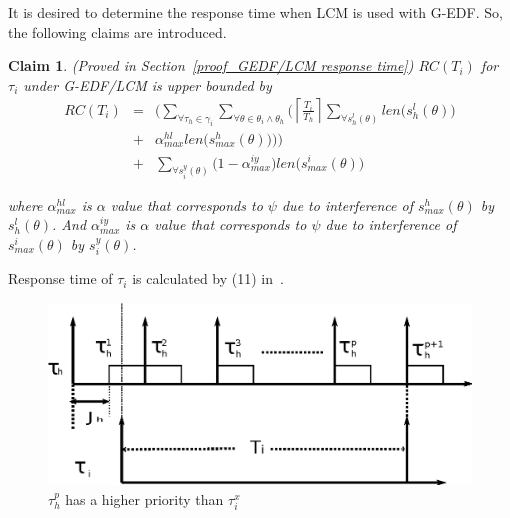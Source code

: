 \documentclass[conference]{sig-alternate}
\newtheorem{clm}{Claim}
\begin{document}
It is desired to determine the response time when LCM is used with G-EDF. So, the following claims are introduced.

\begin{clm}\label{GEDF/LCM response time}
(Proved in Section~\ref{proof_GEDF/LCM response time}) $RC(T_i)$ for $\tau_i$ under G-EDF/LCM is upper bounded by
\begin{eqnarray}
RC(T_i) & = & \Bigg(\sum_{\forall \tau_h \in \gamma_i}\sum_{\forall\theta \in \theta_i \wedge \theta_h}\Bigg(\left\lceil\frac{T_{i}}{T_{h}}\right\rceil\sum_{\forall s_{h}^{l}(\theta)}len\Big(s_{h}^{l}(\theta)\Big)\nonumber\\
& + & \alpha_{max}^{hl}len\Big(s_{max}^{h}(\theta)\Big)\Bigg)\Bigg)\nonumber\\
& + & \sum_{\forall s_{i}^{y}(\theta)}\Big(1-\alpha_{max}^{iy}\Big)len\Big(s_{max}^i(\theta)\Big)  
\label{eq78}\end{eqnarray} 

where $\alpha_{max}^{hl}$ is $\alpha$ value that corresponds to $\psi$ due to interference of $s_{max}^h(\theta)$ by $s_h^l(\theta)$. And $\alpha_{max}^{iy}$ is $\alpha$ value that corresponds to $\psi$ due to interference of $s_{max}^i(\theta)$ by $s_i^y(\theta)$.
\end{clm}

Response time of $\tau_{i}$ is calculated by (11) in~\cite{stmconcurrencycontrol:emsoft11}.
\begin{figure}
\begin{centering}
\includegraphics[scale=0.5]{figures/figure18}
\par\end{centering}
\caption{\label{fig17}$\tau_h^p$ has a higher priority than $\tau_i^x$}
\end{figure}
\end{document}
